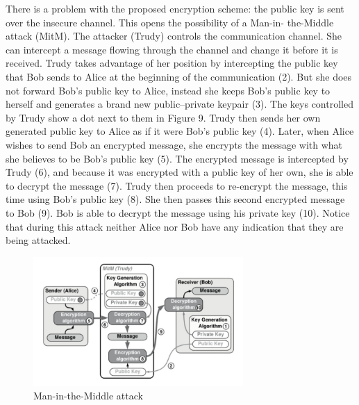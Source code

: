 \documentclass{article}
\begin{document}
\noindent There is a problem with the proposed encryption scheme: the public key is sent over the insecure channel. This opens the possibility of a Man-in- the-Middle attack (MitM). The attacker (Trudy) controls the communication channel. She can intercept a message flowing through the channel and change it before it is received. Trudy takes advantage of her position by intercepting the public key that Bob sends to Alice at the beginning of the communication (2). But she does not forward Bob’s public key to Alice, instead she keeps Bob’s public key to herself and generates a brand new public–private keypair (3). The keys controlled by Trudy show a dot next to them in Figure 9. Trudy then sends her own generated public key to Alice as if it were Bob’s public key (4). Later, when Alice wishes to send Bob an encrypted message, she encrypts the message with what she believes to be Bob’s public key (5). The encrypted message is intercepted by Trudy (6), and because it was encrypted with a public key of her own, she is able to decrypt the message (7). Trudy then proceeds to re-encrypt the message, this time using Bob’s public key (8). She then passes this second encrypted message to Bob (9). Bob is able to decrypt the message using his private key (10). Notice that during this attack neither Alice nor Bob have any indication that they are being attacked.

\begin{figure}[H]
    \centering
    \includegraphics[width=8cm]{images/9.png}
    \caption{Man-in-the-Middle attack}
\end{figure}
\end{document}
